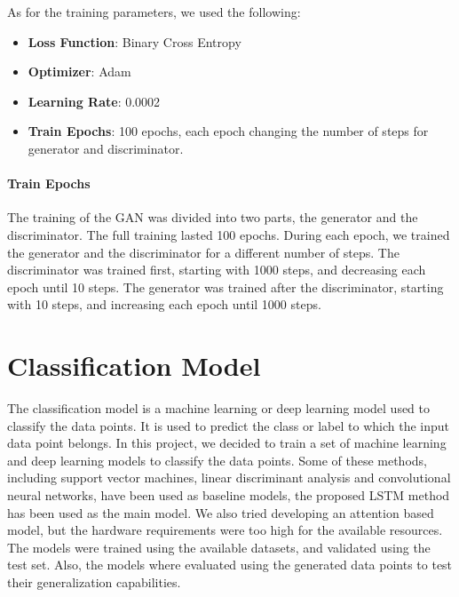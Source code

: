 As for the training parameters, we used the following:
\begin{itemize}
    \item \textbf{Loss Function}: Binary Cross Entropy
    \item \textbf{Optimizer}: Adam
    \item \textbf{Learning Rate}: 0.0002
    \item \textbf{Train Epochs}: 100 epochs, each epoch changing the number of steps for generator and discriminator.
\end{itemize}
\paragraph*{Train Epochs}
The training of the GAN was divided into two parts, the generator and the discriminator.
The full training lasted 100 epochs.
During each epoch, we trained the generator and the discriminator for a different number of steps.
The discriminator was trained first, starting with 1000 steps, and decreasing each epoch until 10 steps.
The generator was trained after the discriminator, starting with 10 steps, and increasing each epoch until 1000 steps.


\section{Classification Model}
The classification model is a machine learning or deep learning model used to classify the data points.
It is used to predict the class or label to which the input data point belongs.
In this project, we decided to train a set of machine learning and deep learning models to classify the data points.
Some of these methods, including support vector machines, linear discriminant analysis and convolutional neural networks, have been used as baseline models, the proposed LSTM method has been used as the main model.
We also tried developing an attention based model, but the hardware requirements were too high for the available resources.
The models were trained using the available datasets, and validated using the test set.
Also, the models where evaluated using the generated data points to test their generalization capabilities.

